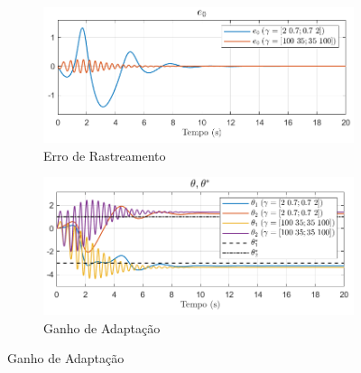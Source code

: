 \documentclass[10pt]{article}
\begin{document}
\begin{figure}[h!]
    \centering
    \begin{subfigure}[b]{0.25\textwidth}
        \centering
        \includegraphics[width=\textwidth]{img/fig09a.png}
        \caption{Erro de Rastreamento}
    \end{subfigure}
    \begin{subfigure}[b]{0.25\textwidth}
        \centering
        \includegraphics[width=\textwidth]{img/fig09b.png}
        \caption{Ganho de Adaptação}
    \end{subfigure}


\end{figure}
\end{document}
